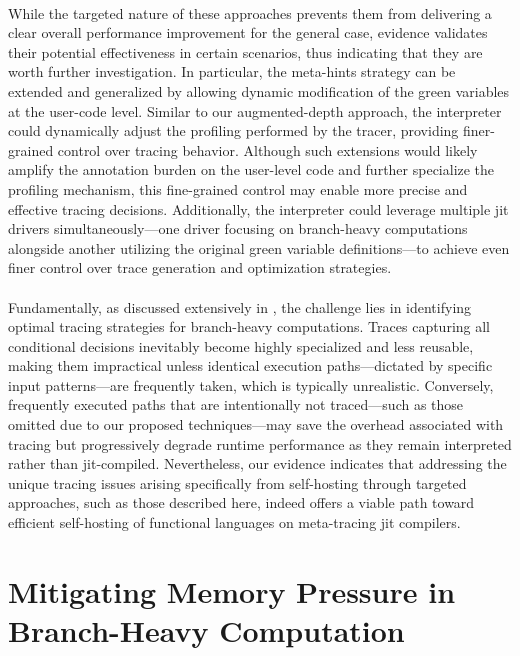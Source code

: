     \paragraph{}%
      While the targeted nature of these approaches prevents them from delivering a clear overall performance improvement for the general case, evidence validates their potential effectiveness in certain scenarios, thus indicating that they are worth further investigation. In particular, the meta-hints strategy can be extended and generalized by allowing dynamic modification of the green variables at the user-code level. Similar to our augmented-depth approach, the interpreter could dynamically adjust the profiling performed by the tracer, providing finer-grained control over tracing behavior. Although such extensions would likely amplify the annotation burden on the user-level code and further specialize the profiling mechanism, this fine-grained control may enable more precise and effective tracing decisions. Additionally, the interpreter could leverage multiple \gls{jit} drivers simultaneously—one driver focusing on branch-heavy computations alongside another utilizing the original green variable definitions—to achieve even finer control over trace generation and optimization strategies.

    \paragraph{}%
      Fundamentally, as discussed extensively in , the challenge lies in identifying optimal tracing strategies for branch-heavy computations. Traces capturing all conditional decisions inevitably become highly specialized and less reusable, making them impractical unless identical execution paths—dictated by specific input patterns—are frequently taken, which is typically unrealistic. Conversely, frequently executed paths that are intentionally not traced—such as those omitted due to our proposed techniques—may save the overhead associated with tracing but progressively degrade runtime performance as they remain interpreted rather than \gls{jit}-compiled. Nevertheless, our evidence indicates that addressing the unique tracing issues arising specifically from self-hosting through targeted approaches, such as those described here, indeed offers a viable path toward efficient self-hosting of functional languages on meta-tracing \gls{jit} compilers.

	\section[\texorpdfstring{Mitigating Memory Pressure in Branch-Heavy Computation}{CEK + Stackful Model}]{Mitigating Memory Pressure in Branch-Heavy Computation}
    \label{section:stackful}

